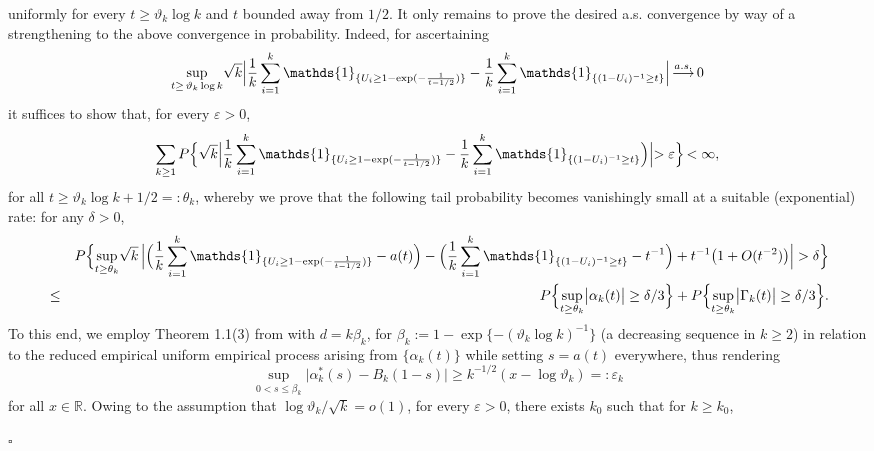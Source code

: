 \documentclass[11pt, a4paper, oneside]{article}
\numberwithin{equation}{section}
\theoremstyle{plain}
\theoremstyle{definition}
\newenvironment{pfofLem}{\noindent{\bf Proof of Lemma}}{\hfill $\square$ \\}
\newcommand{\field}[1]{\mathbb{#1}}
\newcommand{\real}{\ensuremath{{\field{R}}}}
\newcommand{\suprem}[1]{\ensuremath{\displaystyle {\sup_{#1}}}}
\newcommand{\conv}[1]{\ensuremath{\, \displaystyle {\mathop{\longrightarrow}^{#1}}}\, }
\newcommand{\one}{\mathds{1}}
\begin{document}
\begin{pfofLem}{~\ref{Lem:BasicEmpProcess}:}
\begin{equation*}
\end{equation*}
uniformly for every $t \geq \vartheta_k \log k$ and $t$ bounded away from $1/2$. It only remains to prove the desired a.s. convergence by way of a strengthening to the above convergence in probability. Indeed, for ascertaining
\begin{equation}\label{eq:asconvergence}
            \suprem{t \geq \, \vartheta_k\log k}\sqrt{k} \Bigl|\frac{1}{k}\displaystyle\sum_{i=1} ^{k}\one_{\{U_{i}\geq 1-\exp(-\frac{1}{t-1/2})\}} -\frac{1}{k}\displaystyle\sum_{i=1} ^{k}\one_{\{(1-U_i)^{-1} \geq t\}}\Bigl| \conv{a.s.} 0
\end{equation}
it suffices to show that, for every $\varepsilon>0$,
\begin{equation}\label{eq:borel}
    \displaystyle\sum_{k \geq 1} P\Bigl\{      \sqrt{k}     \Bigl|\frac{1}{k}\displaystyle\sum_{i=1}^{k}\one_{\{U_{i}\geq 1-\exp(-\frac{1}{t-1/2})\}}-\frac{1}{k}\displaystyle\sum_{i=1} ^{k}\one_{\{(1-U_i)^{-1} \geq t\}}\Bigl)\Bigl|>\varepsilon\Bigl\}\,<\infty,
\end{equation}
for all $ t\geq \vartheta_{k}\log k+ 1/2 =: \theta_k$, whereby we prove that the following tail probability becomes vanishingly small at a suitable (exponential) rate: for any $\delta>0$,
\begin{eqnarray*}
	& &  P \Bigl\{ \suprem{t \geq \theta_k} \sqrt{k}\, \Bigl| \Bigl( \frac{1}{k}\displaystyle\sum_{i=1} ^{k}\one_{\{U_{i}\geq 1-\exp(-\frac{1}{t-1/2})\}}- a(t) \Bigr) - \Bigl(\frac{1}{k}\displaystyle\sum_{i=1} ^{k}\one_{\{(1-U_i)^{-1} \geq t\}} - t^{-1} \Bigr) +  t^{-1} \bigl(1 + O(t^{-2}) \bigr)\Bigr| > \delta\Bigr\} \\
	&\leq&  P \Bigl\{ \suprem{t \geq \theta_k} \bigl| \alpha_k(t) \bigr| \geq \delta/3 \Bigr\} +  P \Bigl\{ \suprem{t \geq \theta_k}  \bigl|\Gamma_k(t) \bigr| \geq \delta/3\Bigr\}.
\end{eqnarray*}
To this end, we employ Theorem 1.1(3) from \cite{Mason2001} with $d=k \beta_k$,  for $\beta_k := 1-\exp\{ -(\vartheta_k \log k)^{-1}\}$ (a decreasing sequence in $k\geq 2$) in relation to the reduced empirical uniform empirical process arising from $\{\alpha_k(t)\}$ while setting $s = a(t)$ everywhere, thus rendering
\begin{equation*}
	\suprem{0< s \leq \beta_k} \bigl| \alpha^*_k(s) - B_k(1-s)\bigr| \geq k^{-1/2}(x - \log \vartheta_k)=: \varepsilon_k
\end{equation*}
for all $x \in \real$. Owing to the assumption that $\log \vartheta_k/\sqrt{k} = o(1)$, for every $\varepsilon >0$, there exists $k_0$ such that for $k \geq k_0$,

\end{pfofLem}
\end{document}
